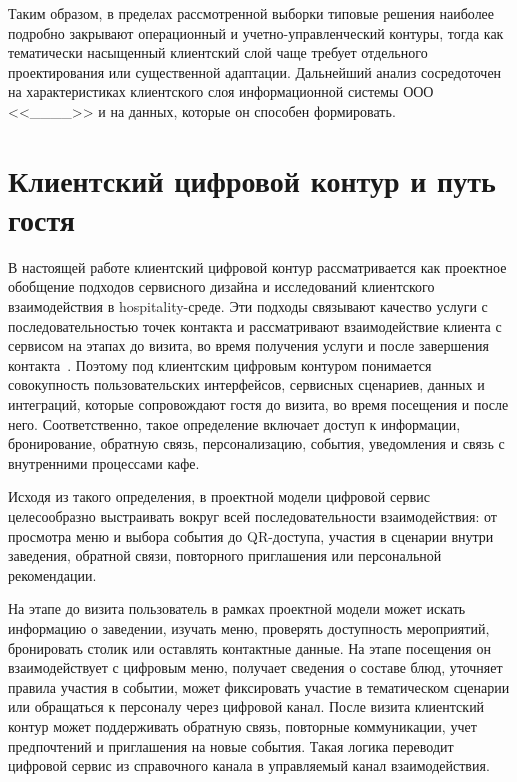 Таким образом, в пределах рассмотренной выборки типовые решения наиболее подробно закрывают операционный и учетно-управленческий контуры, тогда как тематически насыщенный клиентский слой чаще требует отдельного проектирования или существенной адаптации. Дальнейший анализ сосредоточен на характеристиках клиентского слоя информационной системы ООО <<\_\_\_\_>> и на данных, которые он способен формировать.

\section{Клиентский цифровой контур и путь гостя}

В настоящей работе клиентский цифровой контур рассматривается как проектное обобщение подходов сервисного дизайна и исследований клиентского взаимодействия в hospitality-среде. Эти подходы связывают качество услуги с последовательностью точек контакта и рассматривают взаимодействие клиента с сервисом на этапах до визита, во время получения услуги и после завершения контакта~\cite{stickdorn2018, chathoth2016}. Поэтому под клиентским цифровым контуром понимается совокупность пользовательских интерфейсов, сервисных сценариев, данных и интеграций, которые сопровождают гостя до визита, во время посещения и после него. Соответственно, такое определение включает доступ к информации, бронирование, обратную связь, персонализацию, события, уведомления и связь с внутренними процессами кафе.

Исходя из такого определения, в проектной модели цифровой сервис целесообразно выстраивать вокруг всей последовательности взаимодействия: от просмотра меню и выбора события до QR-доступа, участия в сценарии внутри заведения, обратной связи, повторного приглашения или персональной рекомендации.

На этапе до визита пользователь в рамках проектной модели может искать информацию о заведении, изучать меню, проверять доступность мероприятий, бронировать столик или оставлять контактные данные. На этапе посещения он взаимодействует с цифровым меню, получает сведения о составе блюд, уточняет правила участия в событии, может фиксировать участие в тематическом сценарии или обращаться к персоналу через цифровой канал. После визита клиентский контур может поддерживать обратную связь, повторные коммуникации, учет предпочтений и приглашения на новые события. Такая логика переводит цифровой сервис из справочного канала в управляемый канал взаимодействия.

